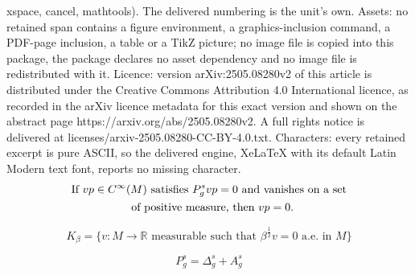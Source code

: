 \documentclass[10pt,a4paper]{amsart}
\newcommand{\R}{\mathbb{R}}
\newcommand{\vp}{{\rm vp}}
\begin{document}
xspace, cancel, mathtools). The delivered numbering is the unit's own. Assets: no retained span contains a figure environment, a graphics-inclusion command, a PDF-page inclusion, a table or a TikZ picture; no image file is copied into this package, the package declares no asset dependency and no image file is redistributed with it. Licence: version arXiv:2505.08280v2 of this article is distributed under the Creative Commons Attribution 4.0 International licence, as recorded in the arXiv licence metadata for this exact version and shown on the abstract page https://arxiv.org/abs/2505.08280v2. A full rights notice is delivered at licenses/arxiv-2505.08280-CC-BY-4.0.txt. Characters: every retained excerpt is pure ASCII, so the delivered engine, XeLaTeX with its default Latin Modern text font, reports no missing character.
\begin{equation} \label{eq:unique:continuation} 
\begin{aligned}
\text{ If } & \vp \in C^\infty(M)  \text{ satisfies }  P_g^s \vp = 0 \text{ and vanishes on a set }  \\
& \qquad \qquad \text{ of positive measure, then } \vp = 0. 
\end{aligned}
\end{equation}

\begin{equation} \label{def:Kbeta}
K_\beta = \Big \{ v: M \to \R \text{ measurable such that }  \beta^{\frac{1}{2}} v = 0 \text{ a.e. in } M \Big \} 
\end{equation}

\begin{equation} \label{eq:def:Ag}
 P_g^s = \Delta_g^s + A_g^s
 \end{equation}
\end{document}
